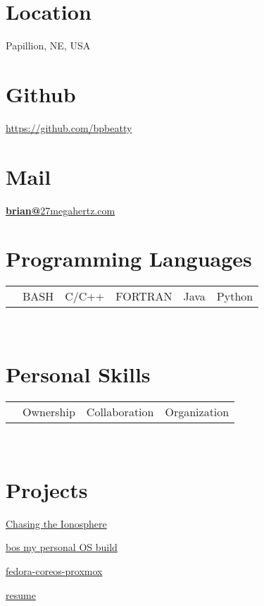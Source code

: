 \documentclass[]{src/friggeri-cv}
\begin{document}
    {}


\begin{aside}
  \section{Location}
    Papillion, NE, USA
    ~
  \section{Github}
    \href{https://github.com/bpbeatty}{https://github.com/bpbeatty}
    ~
  \section{Mail}
    \href{mailto:brian@27megahertz.com}{\textbf{brian@}27megahertz.com}
    ~
  \section{Programming Languages}
    \begin{tabular}{p{1.1cm} p{2.5cm}}
       & {BASH}

       & {C/C++}

       & {FORTRAN}

       & {Java}

       & {Python}

    \end{tabular}
    ~
  \section{Personal Skills}
    \begin{tabular}{p{1.2cm} p{2.0cm}}
       & {Ownership}

       & {Collaboration}

       & {Organization}

    \end{tabular}
    ~
  \section{Projects}
    \item[\rightarrow]\href{https://www.northropgrumman.com/space/chasing-the-ionosphere}{Chasing the Ionosphere}
    \item[\rightarrow]\href{https://github.com/bpbeatty/bos}{bos my personal OS build}
    \item[\rightarrow]\href{https://github.com/bpbeatty/fedora-coreos-proxmox}{fedora-coreos-proxmox}
    \item[\rightarrow]\href{https://github.com/bpbeatty/resume}{resume}
    ~

\end{aside}
\end{document}
